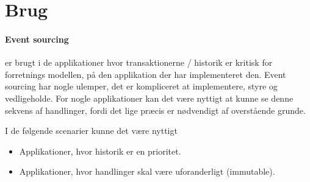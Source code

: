 \section{Brug}

\paragraph{Event sourcing} er brugt i de applikationer hvor transaktionerne / historik er kritisk for forretnings modellen, på den applikation der har implementeret den. Event sourcing har nogle ulemper, det er kompliceret at implementere, styre og vedligeholde. For nogle applikationer kan det være nyttigt at kunne se denne sekvens af handlinger, fordi det lige præcis er nødvendigt af overstående grunde. \newline

I de følgende scenarier kunne det være nyttigt

\begin{itemize}  
    \item Applikationer, hvor historik er en prioritet.
    \item Applikationer, hvor handlinger skal være uforanderligt (immutable).
\end{itemize}